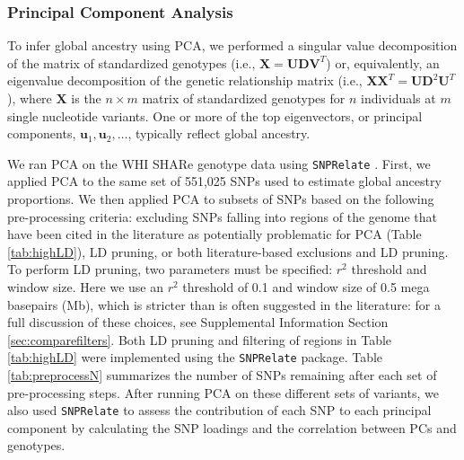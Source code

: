 \documentclass[12pt]{article}
\begin{document}
\subsubsection{Principal Component Analysis}

To infer global ancestry using PCA, we performed a singular value decomposition of the matrix of standardized genotypes (i.e., $\mathbf{X} = \mathbf{U}\mathbf{D}\mathbf{V}^T$) or, equivalently, an eigenvalue decomposition of the genetic relationship matrix (i.e., $\mathbf{X}\mathbf{X}^T = \mathbf{U}\mathbf{D}^2\mathbf{U}^T$), where $\mathbf{X}$ is the $n \times m$ matrix of standardized genotypes for $n$ individuals at $m$ single nucleotide variants.
One or more of the top eigenvectors, or principal components, $\mathbf{u}_1, \mathbf{u}_2, \dots$, typically reflect global ancestry.

We ran PCA on the WHI SHARe genotype data using \texttt{SNPRelate} \citep{snprelate}. 
First, we applied PCA to the same set of 551,025 SNPs used to estimate global ancestry proportions.
We then applied PCA to subsets of SNPs based on the following pre-processing criteria: excluding SNPs falling into regions of the genome that have been cited in the literature as potentially problematic for PCA (Table \ref{tab:highLD}), LD pruning, or both literature-based exclusions and LD pruning.
To perform LD pruning, two parameters must be specified: $r^2$ threshold and window size. 
Here we use an $r^2$ threshold of 0.1 and window size of 0.5 mega basepairs (Mb), which is stricter than is often suggested in the literature: for a full discussion of these choices, see Supplemental Information Section \ref{sec:comparefilters}.
Both LD pruning and filtering of regions in Table \ref{tab:highLD} were implemented using the \texttt{SNPRelate} package.
Table \ref{tab:preprocessN} summarizes the number of SNPs remaining after each set of pre-processing steps.
After running PCA on these different sets of variants, we also used \texttt{SNPRelate} to assess the contribution of each SNP to each principal component by calculating the SNP loadings and the correlation between PCs and genotypes.
\end{document}
